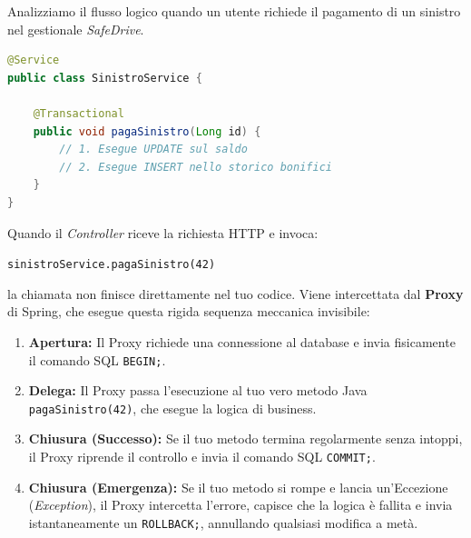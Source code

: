 \begin{example}
Analizziamo il flusso logico quando un utente richiede il pagamento di un sinistro nel gestionale \textit{SafeDrive}.
\begin{lstlisting}[language=Java, basicstyle=\ttfamily\small, keywordstyle=\color{blue}\bfseries]
@Service
public class SinistroService {

    @Transactional
    public void pagaSinistro(Long id) {
        // 1. Esegue UPDATE sul saldo
        // 2. Esegue INSERT nello storico bonifici
    }
}
\end{lstlisting}

Quando il \textit{Controller} riceve la richiesta HTTP e invoca:
\begin{center}
    \texttt{sinistroService.pagaSinistro(42)}
\end{center}

la chiamata non finisce direttamente nel tuo codice. Viene intercettata dal \textbf{Proxy} di Spring, che esegue questa rigida sequenza meccanica invisibile:
\begin{enumerate}
    \item \textbf{Apertura:} Il Proxy richiede una connessione al database e invia fisicamente il comando SQL \texttt{BEGIN;}.
    \item \textbf{Delega:} Il Proxy passa l'esecuzione al tuo vero metodo Java \texttt{pagaSinistro(42)}, che esegue la logica di business.
    \item \textbf{Chiusura (Successo):} Se il tuo metodo termina regolarmente senza intoppi, il Proxy riprende il controllo e invia il comando SQL \texttt{COMMIT;}.
    \item \textbf{Chiusura (Emergenza):} Se il tuo metodo si rompe e lancia un'Eccezione (\textit{Exception}), il Proxy intercetta l'errore, capisce che la logica è fallita e invia istantaneamente un \texttt{ROLLBACK;}, annullando qualsiasi modifica a metà.
\end{enumerate}
\end{example}

